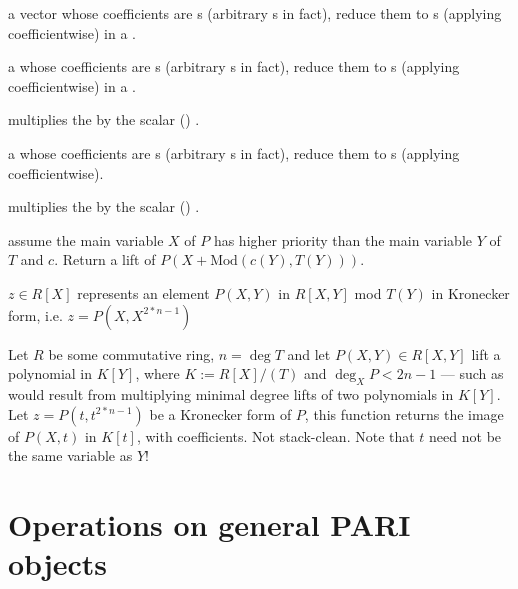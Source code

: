 
  a vector whose
coefficients are s (arbitrary s in fact), reduce them to
s (applying  coefficientwise) in a .

  a  whose
coefficients are s (arbitrary s in fact), reduce them to
s (applying  coefficientwise) in a .

  multiplies the
   by the scalar () .


  a  whose
coefficients are s (arbitrary s in fact), reduce them to
s (applying  coefficientwise).


 multiplies the 
 by the scalar () .





 assume the main variable
$X$ of $P$ has higher priority than the main variable $Y$ of $T$ and $c$.
Return a lift of $P(X+\text{Mod}(c(Y), T(Y)))$.

 $z\in R[X]$ represents an element
$P(X,Y)$ in $R[X,Y]$ mod $T(Y)$ in Kronecker form, i.e. $z = P(X,X^{2*n-1})$

Let $R$ be some commutative ring, $n = \deg T$ and let $P(X,Y)\in R[X,Y]$ lift
a polynomial in $K[Y]$, where $K := R[X]/(T)$ and $\deg_X P < 2n-1$ --- such as
would result from multiplying minimal degree lifts of two polynomials in
$K[Y]$. Let $z = P(t,t^{2*n-1})$ be a Kronecker form of $P$, this function
returns the image of $P(X,t)$ in $K[t]$, with  coefficients.
Not stack-clean. Note that $t$ need not be the same variable as $Y$!

\newpage
\chapter{Operations on general PARI objects}

